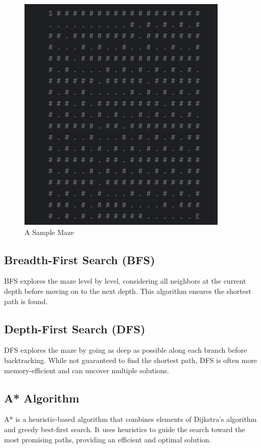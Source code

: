 \documentclass[12pt]{report}
\begin{document}
\begin{figure}[h]
        \begin{center}
         \includegraphics[width=1\linewidth]{Figures/grid.jpg}
        \end{center}
        \caption{A Sample Maze}
     \end{figure}

\subsection{Breadth-First Search (BFS)}
BFS explores the maze level by level, considering all neighbors at the current depth before moving on to the next depth. This algorithm ensures the shortest path is found.

\subsection{Depth-First Search (DFS)}
DFS explores the maze by going as deep as possible along each branch before backtracking. While not guaranteed to find the shortest path, DFS is often more memory-efficient and can uncover multiple solutions.
\subsection{A* Algorithm}
A* is a heuristic-based algorithm that combines elements of Dijkstra's algorithm and greedy best-first search. It uses heuristics to guide the search toward the most promising paths, providing an efficient and optimal solution.
\end{document}
